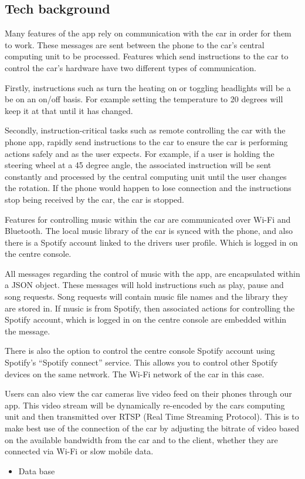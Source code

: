 \documentclass{article}
\begin{document}
\subsection{Tech background}\label{ssec:app-tech} %
Many features of the app rely on communication with the car in order for them to work. These messages are sent between the phone to the car's central computing unit to be processed. Features which send instructions to the car to control the car's hardware have two different types of communication.

Firstly, instructions such as turn the heating on or toggling headlights will be a be on an on/off basis. For example setting the temperature to 20 degrees will keep it at that until it has changed.

Secondly, instruction-critical tasks such as remote controlling the car with the phone app, rapidly send instructions to the car to ensure the car is performing actions safely and as the user expects. For example, if a user is holding the steering wheel at a 45 degree angle, the associated instruction will be sent constantly and processed by the central computing unit until the user changes the rotation. If the phone would happen to lose connection and the instructions stop being received by the car, the car is stopped.

Features for controlling music within the car are communicated over Wi-Fi and Bluetooth. The local music library of the car is synced with the phone, and also there is a Spotify account linked to the drivers user profile. Which is logged in on the centre console.

All messages regarding the control of music with the app, are encapsulated within a JSON object. These messages will hold instructions such as play, pause and song requests. Song requests will contain music file names and the library they are stored in.
If music is from Spotify, then associated actions for controlling the Spotify account, which is logged in on the centre console are embedded within the message.

There is also the option to control the centre console Spotify account using Spotify's ``Spotify connect'' service. This allows you to control other Spotify devices on the same network. The Wi-Fi network of the car in this case.

Users can also view the car cameras live video feed on their phones through our app. This video stream will be dynamically re-encoded by the cars computing unit and then transmitted over RTSP (Real Time Streaming Protocol). This is to make best use of the connection of the car by adjusting the bitrate of video based on the available bandwidth from the car and to the client, whether they are connected via Wi-Fi or slow mobile data.
\begin{itemize}
  \item Data base
\end{itemize}
\end{document}
